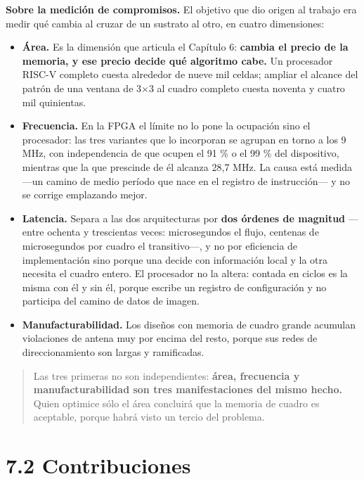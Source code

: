 \textbf{Sobre la medición de compromisos.} El objetivo que dio origen al
trabajo era medir qué cambia al cruzar de un sustrato al otro, en cuatro
dimensiones:

\begin{itemize}
\tightlist
\item
  \textbf{Área.} Es la dimensión que articula el Capítulo 6:
  \textbf{cambia el precio de la memoria, y ese precio decide qué
  algoritmo cabe.} Un procesador RISC-V completo cuesta alrededor de
  nueve mil celdas; ampliar el alcance del patrón de una ventana de 3×3
  al cuadro completo cuesta noventa y cuatro mil quinientas.
\item
  \textbf{Frecuencia.} En la FPGA el límite no lo pone la ocupación sino
  el procesador: las tres variantes que lo incorporan se agrupan en
  torno a los 9 MHz, con independencia de que ocupen el 91 \% o el 99 \%
  del dispositivo, mientras que la que prescinde de él alcanza 28,7 MHz.
  La causa está medida ---un camino de medio período que nace en el
  registro de instrucción--- y no se corrige emplazando mejor.
\item
  \textbf{Latencia.} Separa a las dos arquitecturas por \textbf{dos
  órdenes de magnitud} ---entre ochenta y trescientas veces:
  microsegundos el flujo, centenas de microsegundos por cuadro el
  transitivo---, y no por eficiencia de implementación sino porque una
  decide con información local y la otra necesita el cuadro entero. El
  procesador no la altera: contada en ciclos es la misma con él y sin
  él, porque escribe un registro de configuración y no participa del
  camino de datos de imagen.
\item
  \textbf{Manufacturabilidad.} Los diseños con memoria de cuadro grande
  acumulan violaciones de antena muy por encima del resto, porque sus
  redes de direccionamiento son largas y ramificadas.
\end{itemize}

\begin{quote}
Las tres primeras no son independientes: \textbf{área, frecuencia y
manufacturabilidad son tres manifestaciones del mismo hecho.} Quien
optimice sólo el área concluirá que la memoria de cuadro es aceptable,
porque habrá visto un tercio del problema.
\end{quote}

\section{7.2 Contribuciones}\label{contribuciones}


